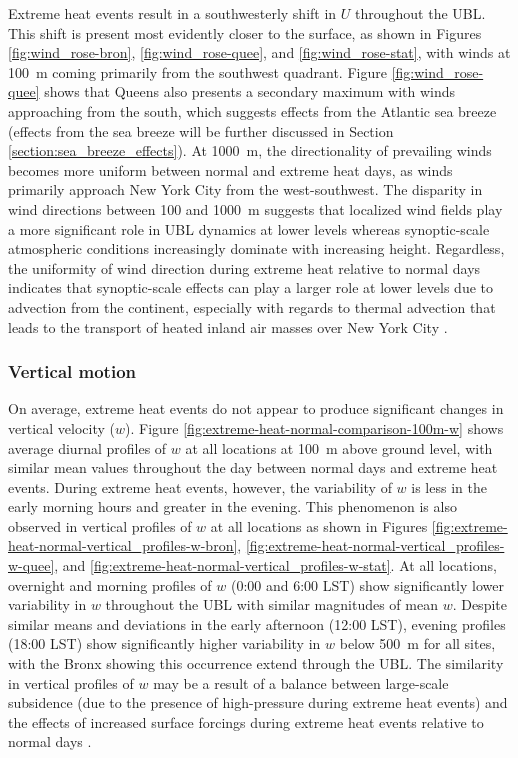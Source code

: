 \documentclass[11pt,a4paper]{article}
\begin{document}
Extreme heat events result in a southwesterly shift in $U$ throughout the UBL. This shift is present most evidently closer to the surface, as shown in Figures \ref{fig:wind_rose-bron}, \ref{fig:wind_rose-quee}, and \ref{fig:wind_rose-stat}, with winds at \SI{100}{\meter} coming primarily from the southwest quadrant. Figure \ref{fig:wind_rose-quee} shows that Queens also presents a secondary maximum with winds approaching from the south, which suggests effects from the Atlantic sea breeze (effects from the sea breeze will be further discussed in Section \ref{section:sea_breeze_effects}). At \SI{1000}{\meter}, the directionality of prevailing winds becomes more uniform between normal and extreme heat days, as winds primarily approach New York City from the west-southwest. The disparity in wind directions between 100 and \SI{1000}{\meter} suggests that localized wind fields play a more significant role in UBL dynamics at lower levels whereas synoptic-scale atmospheric conditions increasingly dominate with increasing height. Regardless, the uniformity of wind direction during extreme heat relative to normal days indicates that synoptic-scale effects can play a larger role at lower levels due to advection from the continent, especially with regards to thermal advection that leads to the transport of heated inland air masses over New York City \citep{ramamurthy2017b}.

\subsubsection{Vertical motion}
On average, extreme heat events do not appear to produce significant changes in vertical velocity ($w$). Figure \ref{fig:extreme-heat-normal-comparison-100m-w} shows average diurnal profiles of $w$ at all locations at \SI{100}{\meter} above ground level, with similar mean values throughout the day between normal days and extreme heat events. During extreme heat events, however, the variability of $w$ is less in the early morning hours and greater in the evening. This phenomenon is also observed in vertical profiles of $w$ at all locations as shown in Figures \ref{fig:extreme-heat-normal-vertical_profiles-w-bron}, \ref{fig:extreme-heat-normal-vertical_profiles-w-quee}, and \ref{fig:extreme-heat-normal-vertical_profiles-w-stat}. At all locations, overnight and morning profiles of $w$ (0:00 and 6:00 LST) show significantly lower variability in $w$ throughout the UBL with similar magnitudes of mean $w$. Despite similar means and deviations in the early afternoon (12:00 LST), evening profiles (18:00 LST) show significantly higher variability in $w$ below \SI{500}{\meter} for all sites, with the Bronx showing this occurrence extend through the UBL. The similarity in vertical profiles of $w$ may be a result of a balance between large-scale subsidence (due to the presence of high-pressure during extreme heat events) and the effects of increased surface forcings during extreme heat events relative to normal days \citep{dong2018, zhang2009}.
\end{document}
